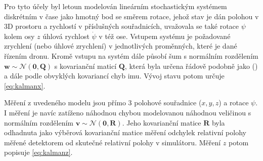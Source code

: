         Pro tyto účely byl letoun modelován lineárním stochastickým systémem diskrétním v čase jako hmotný bod se směrem rotace, jehož stav je dán polohou v 3D prostoru a rychlostí v příslušných souřadnicích, uvažovala se také rotace $\psi$ kolem osy $z$ úhlová rychlost $\dot \psi$ v též ose. Vstupem systému je požadované zrychlení (nebo úhlové zrychlení) v jednotlivých proměnných, které je dané řízením dronu. Kromě vstupu na systém dále působí šum s normálním rozdělením $\mathbf{w} \sim \mathcal{N}(\mathbf{0},\mathbf{Q})$ s kovarianční maticí $\mathbf{Q}$, která byla určena řádově podobně jako \citeauthor{Kojima2015} (\citeyear{Kojima2015}) a dále podle obvyklých kovariancí chyb \acrshort{imu}. %
        Vývoj stavu potom určuje \cref{eq:kalmanx}.

        Měření z uvedeného modelu jsou přímo 3 polohové souřadnice ($x, y, z$) a rotace $\psi$. I měření je navíc zatíženo náhodnou chybou modelovanou náhodnou veličinou s normálním rozdělením $\mathbf{v} \sim \mathcal{N}(\mathbf{0},\mathbf{R})$. Jeho kovarianční matice $\mathbf{R}$ byla odhadnuta jako výběrová kovarianční matice měření odchylek relativní polohy měřené detektorem od skutečné relativní polohy v simulátoru. Měření $z$ potom popisuje \cref{eq:kalmanz}.

